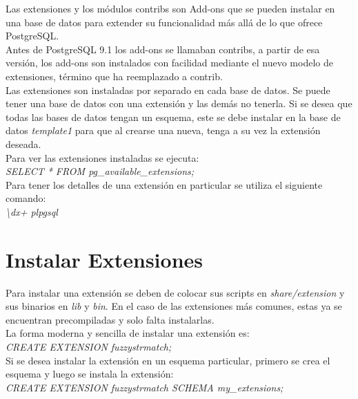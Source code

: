 Las extensiones y los módulos contribs son Add-ons que se pueden instalar en una base de datos para  extender su funcionalidad más allá de lo que ofrece PostgreSQL. \\

Antes de PostgreSQL 9.1 los add-ons se llamaban contribs, a partir de esa versión, los add-ons son instalados con facilidad mediante el nuevo modelo de extensiones, término que ha reemplazado a contrib.\\

Las extensiones son instaladas por separado en cada base de datos. Se puede tener una base de datos con una extensión y las demás no tenerla. Si se desea que todas las bases de datos tengan un esquema, este se debe instalar en la base de datos \textit{template1} para que al crearse una nueva, tenga a su vez la extensión deseada.\\

Para ver las extensiones instaladas se ejecuta:\\

\textit{SELECT * FROM pg\_available\_extensions;}\\

Para tener los detalles de una extensión en particular se utiliza el siguiente comando:\\

\textit{\textbackslash dx+ plpgsql}\\

\section{Instalar Extensiones}

Para instalar una extensión se deben de colocar sus scripts en \textit{share/extension} y sus binarios en \textit{lib} y \textit{bin}. En el caso de las extensiones más comunes, estas ya se encuentran precompiladas y solo falta instalarlas.\\

La forma moderna y sencilla de instalar una extensión es:\\

\emph{CREATE EXTENSION fuzzystrmatch;}\\

Si se desea instalar la extensión en un esquema particular, primero se crea el esquema y luego se instala la extensión:\\

\emph{CREATE EXTENSION fuzzystrmatch SCHEMA my\_extensions;} \\

